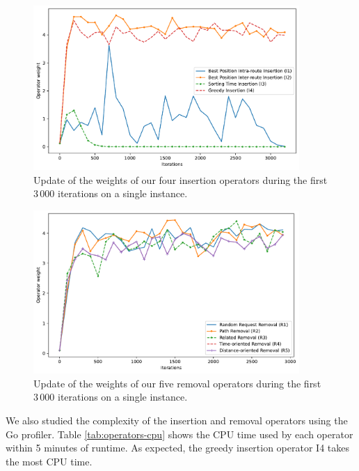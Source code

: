     \begin{figure}[!ht]
        \centering
        \includegraphics[width=0.9\textwidth]{figures/insertion-operators.pdf}
        \caption{Update of the weights of our four insertion operators during the first 3\,000 iterations on a single instance.}
        \label{fig:graph-insertion}
    \end{figure}
    
    \begin{figure}[!ht]
        \centering
        \includegraphics[width=0.9\textwidth]{figures/removal-operators.pdf}
        \caption{Update of the weights of our five removal operators during the first 3\,000 iterations on a single instance.}
        \label{fig:graph-removal}
    \end{figure}

    
    
    We also studied the complexity of the insertion and removal operators using the Go profiler. Table \ref{tab:operators-cpu} shows the CPU time used by each operator within 5 minutes of runtime. As expected, the greedy insertion operator I4 takes the most CPU time.
